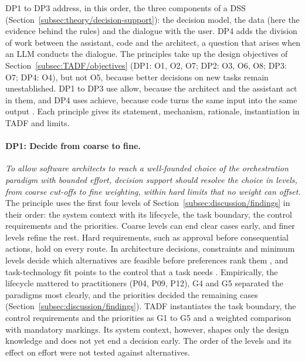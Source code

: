DP1 to DP3 address, in this order, the three components of a DSS (Section~\ref{subsec:theory/decision-support}): the decision model, the data (here the evidence behind the rules) and the dialogue with the user. DP4 adds the division of work between the assistant, code and the architect, a question that arises when an LLM conducts the dialogue. The principles take up the design objectives of Section~\ref{subsec:TADF/objectives} (DP1: O1, O2, O7; DP2: O3, O6, O8; DP3: O7; DP4: O4), but not O5, because better decisions on new tasks remain unestablished. DP1 to DP3 use allow, because the architect and the assistant act in them, and DP4 uses achieve, because code turns the same input into the same output \parencite{australiannationaluniversityaustraliaResearchPerspectivesAnatomy2020}. Each principle gives its statement, mechanism, rationale, instantiation in TADF and limits.

\paragraph{DP1: Decide from coarse to fine.}
\emph{To allow software architects to reach a well-founded choice of the orchestration paradigm with bounded effort, decision support should resolve the choice in levels, from coarse cut-offs to fine weighting, within hard limits that no weight can offset.} The principle uses the first four levels of Section~\ref{subsec:discussion/findings} in their order: the system context with its lifecycle, the task boundary, the control requirements and the priorities. Coarse levels can end clear cases early, and finer levels refine the rest. Hard requirements, such as approval before consequential actions, hold on every route. In architecture decisions, constraints and minimum levels decide which alternatives are feasible before preferences rank them \parencite{falessiDecisionmakingTechniquesSoftware2011,amellerLinkingQualityAttributes2012}, and task-technology fit points to the control that a task needs \parencite{goodhueTaskTechnologyFitIndividual1995}. Empirically, the lifecycle mattered to practitioners (P04, P09, P12), G4 and G5 separated the paradigms most clearly, and the priorities decided the remaining cases (Section~\ref{subsec:discussion/findings}). TADF instantiates the task boundary, the control requirements and the priorities as G1 to G5 and a weighted comparison with mandatory markings. Its system context, however, shapes only the design knowledge and does not yet end a decision early. The order of the levels and its effect on effort were not tested against alternatives.

